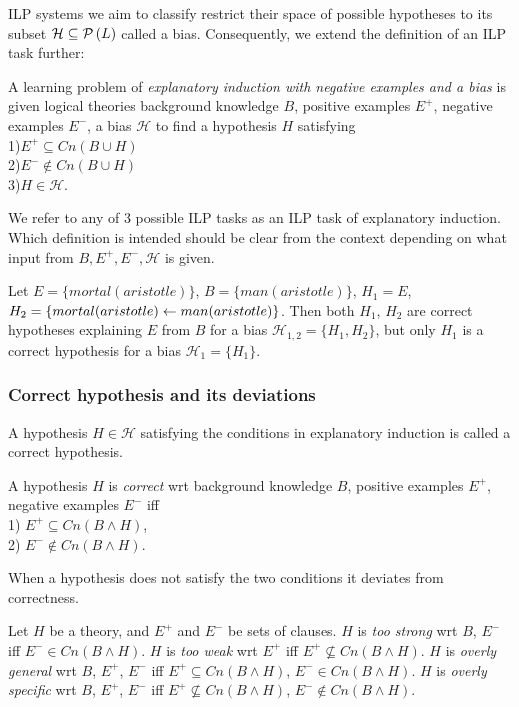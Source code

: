 ILP systems we aim to classify restrict their space of possible hypotheses to its subset $\mathcal{H} \subseteq \mathcal{P} \left({ L }\right)$ called a bias. Consequently, we extend the definition of an ILP task further:
\begin{defn}\label{definition_explanatory_induction_with_bias}
A learning problem of \emph{explanatory induction with negative examples and a bias} is given logical theories background knowledge $B$, positive examples $E^{+}$, negative examples $E^{-}$, a bias $\mathcal{H}$ to find a hypothesis $H$ satisfying\\
1)$E^{+} \subseteq Cn(B \cup H)$\\
2)$E^{-} \not\in Cn(B \cup H)$\\
3)$H \in \mathcal{H}$.
\end{defn}

We refer to any of 3 possible ILP tasks as an ILP task of explanatory induction. Which definition is intended should be clear from the context depending on what input from $B, E^+, E^-, \mathcal{H}$ is given.

\begin{exmp}\label{explanatory_induction_example}
Let $E=\{mortal(aristotle)\}$, $B=\{man(aristotle)\}$,
$H_1=E$, $H_2=\{mortal(aristotle) \leftarrow man(aristotle)\}$.
Then both $H_1$, $H_2$ are correct hypotheses explaining $E$ from $B$ for a bias $\mathcal{H}_{1,2}=\{H_1, H_2\}$, but only $H_1$ is a correct hypothesis for a bias $\mathcal{H}_1=\{H_1\}$.
\end{exmp}

\subsubsection{Correct hypothesis and its deviations\cite{nienhuys1997foundations}}\label{correct_hypothesis}
A hypothesis $H \in \mathcal{H}$ satisfying the conditions in explanatory induction is called a correct hypothesis.
\begin{defn}
A hypothesis $H$ is \emph{correct} wrt background knowledge $B$, positive examples $E^+$, negative examples $E^-$ iff\\
1) $E^+ \subseteq Cn(B \land H)$,\\
2) $E^- \not\in Cn(B \land H)$.
\end{defn}

When a hypothesis does not satisfy the two conditions it deviates from correctness.

\begin{defn}
Let $H$ be a theory, and $E^+$ and $E^-$ be sets of clauses.
$H$ is \emph{too strong} wrt $B$, $E^-$ iff
$E^- \in Cn(B \land H)$.
$H$ is \emph{too weak} wrt
$E^+$ iff $E^+ \not\subseteq Cn(B \land H)$.
$H$ is \emph{overly general} wrt $B$, $E^+$, $E^-$ iff
$E^+ \subseteq Cn(B \land H)$, $E^- \in Cn(B \land H)$.
$H$ is \emph{overly specific} wrt $B$, $E^+$, $E^-$ iff
$E^+ \not\subseteq Cn(B \land H)$, $E^- \not\in Cn(B \land H)$.
\end{defn}

